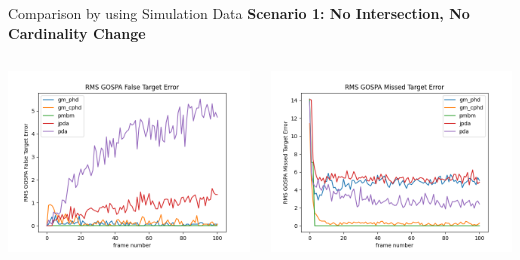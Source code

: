 \documentclass[12pt]{beamer}
\begin{document}
\begin{frame}{Comparison by using Simulation Data}
\textbf{Scenario 1: No Intersection, No Cardinality Change}
\begin{columns}[t]
  \begin{column}{0.5\linewidth}
      \centering
      \includegraphics[width=\linewidth,height=\textheight,keepaspectratio]{real_data/scenario1/gospa_false.png}\\
  \end{column}
    \begin{column}{0.5\linewidth}
      \centering
      \includegraphics[width=\linewidth,height=\textheight,keepaspectratio]{real_data/scenario1/missed.png}\\
  \end{column}
\end{columns}
\end{frame}
\end{document}

